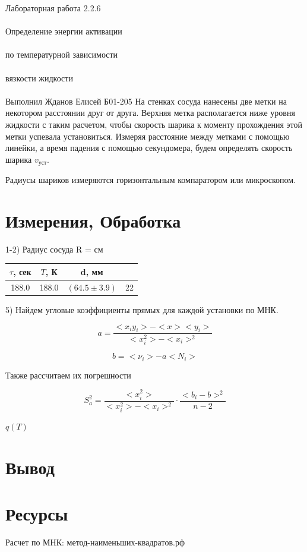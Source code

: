 \documentclass{astroedu-lab}
\begin{document}
\begin{problem}{\huge Лабораторная работа 2.2.6\\\\Определение энергии активации\\\\по температурной зависимости\\\\вязкости жидкости\\\\Выполнил Жданов Елисей Б01-205}
На стенках сосуда нанесены две метки на некотором расстоянии друг от друга. Верхняя метка располагается ниже уровня жидкости с таким расчетом, чтобы скорость шарика к моменту прохождения этой метки успевала установиться. Измеряя расстояние между метками с помощью линейки, а время падения с помощью секундомера, будем определять скорость шарика $v_\text{уст}$.

Радиусы шариков измеряются горизонтальным компаратором или микроскопом.

\section{Измерения, Обработка}

1-2) Радиус сосуда R = см

\begin{center}
\begin{tabular}{|c|c|c|c|}
\hline 
$\tau$, сек & $T$, К & d, мм & \\
\hline
188.0 & 188.0 & $(64.5 \pm 3.9)$ & 22\\
\hline
\end{tabular}
\end{center}


5) Найдем угловые коэффициенты прямых для каждой установки по МНК.

\[
	a = \frac{<x_i y_i> - < x > < y_i >}{< x_i^2> - < x_i >^2}
\]

\[
	b = < \nu_i > - a < N_i >
\]

Также рассчитаем их погрешности

\begin{equation}
	S_a^2 = \frac{< x_i^2>}{< x_i^2 > - < x_i >^2} \cdot \frac{<  b_i - b > ^2}{n - 2}
\end{equation}


\begin{center}
	\Large $q(T)$
\end{center}


\section{Вывод}


\section{Ресурсы}

Расчет по МНК: метод-наименьших-квадратов.рф


\end{problem}
\end{document}

